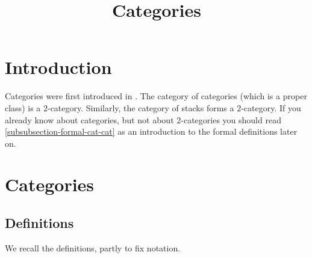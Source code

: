  

\UseAllTwocells

%


\title{Categories}


\maketitle

\tableofcontents
\section{Introduction}
\label{section-introduction}

\noindent
Categories were first introduced in \cite{GenEqui}.
The category of categories (which is a proper class)
is a $2$-category. Similarly, the category of stacks
forms a $2$-category. If you already know
about categories, but not about $2$-categories you
should read \ref{subsubsection-formal-cat-cat} as
an introduction to the formal definitions later on.

\section{Categories}
\label{section-categories}

\subsection{Definitions}
\label{subsection-definition-categories}

\noindent
We recall the definitions, partly to fix notation.

